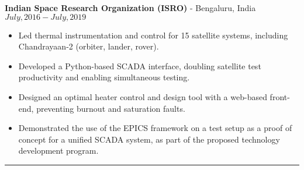 \textbf{Indian Space Research Organization (ISRO)} - Bengaluru, India \hfill $July, 2016 - July, 2019$

\begin{itemize}
        \item Led thermal instrumentation and control for 15 satellite systems, including Chandrayaan-2 (orbiter, lander, rover).
        \item Developed a Python-based SCADA interface, doubling satellite test productivity and enabling simultaneous testing.
	\item Designed an optimal heater control and design tool with a web-based front-end, preventing burnout and saturation faults.
        \item Demonstrated the use of the EPICS framework on a test setup as a proof of concept for a unified SCADA
                system, as part of the proposed technology development program.
\end{itemize}
\noindent\rule{\textwidth}{0.4pt}
